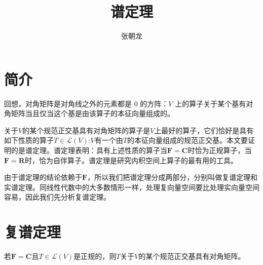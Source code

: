 \documentclass[10pt,a4paper,UTF8]{article}
\author{张朝龙}
\date{}
\title{谱定理}
\begin{document}
\maketitle
\tableofcontents
{}

\section{简介}
\label{sec:org9a2594a}


回想，对角矩阵是对角线之外的元素都是 0 的方阵：\(V\) 上的算子关于某个基有对角矩阵当且仅当这个基是由该算子的本征向量组成的。

关于\(V\)的某个规范正交基具有对角矩阵的算子是\(V\)上最好的算子，它们恰好是具有如下性质的算子\(T\in \mathcal{L}(V)\):\(V\)有一个由\(T\)的本征向量组成的规范正交基。本文要证明的是谱定理。谱定理表明：具有上述性质的算子当\(\mathbf{F} = \mathbf{C}\)时恰为正规算子，当\(\mathbf{F} = \mathbf{R}\)时，恰为自伴算子。谱定理是研究内积空间上算子的最有用的工具。

由于谱定理的结论依赖于\(\mathbf{F}\)，所以我们把谱定理分成两部分，分别叫做复谱定理和实谱定理。同线性代数中的大多数情形一样，处理复向量空间要比处理实向量空间容易，因此我们先分析复谱定理。

\section{复谱定理}
\label{sec:orge57871e}


若\(\mathbf{F} = \mathbf{C}\)且\(T\in \mathcal{L}(V)\)是正规的，则\(T\)关于\(V\)的某个规范正交基具有对角矩阵。
\end{document}
